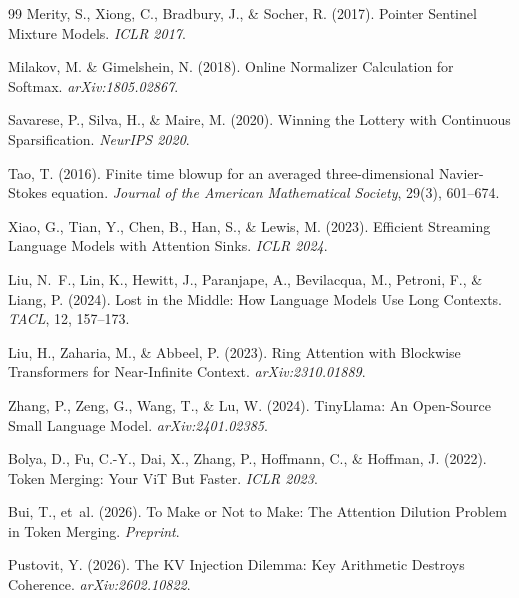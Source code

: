 \documentclass[11pt,a4paper]{article}
\begin{document}
\begin{thebibliography}{99}
Merity, S., Xiong, C., Bradbury, J., \& Socher, R. (2017).
\newblock Pointer Sentinel Mixture Models.
\newblock \emph{ICLR 2017}.

Milakov, M. \& Gimelshein, N. (2018).
\newblock Online Normalizer Calculation for Softmax.
\newblock \emph{arXiv:1805.02867}.

Savarese, P., Silva, H., \& Maire, M. (2020).
\newblock Winning the Lottery with Continuous Sparsification.
\newblock \emph{NeurIPS 2020}.

Tao, T. (2016).
\newblock Finite time blowup for an averaged three-dimensional Navier-Stokes equation.
\newblock \emph{Journal of the American Mathematical Society}, 29(3), 601--674.

Xiao, G., Tian, Y., Chen, B., Han, S., \& Lewis, M. (2023).
\newblock Efficient Streaming Language Models with Attention Sinks.
\newblock \emph{ICLR 2024}.

Liu, N.~F., Lin, K., Hewitt, J., Paranjape, A., Bevilacqua, M., Petroni, F., \& Liang, P. (2024).
\newblock Lost in the Middle: How Language Models Use Long Contexts.
\newblock \emph{TACL}, 12, 157--173.

Liu, H., Zaharia, M., \& Abbeel, P. (2023).
\newblock Ring Attention with Blockwise Transformers for Near-Infinite Context.
\newblock \emph{arXiv:2310.01889}.

Zhang, P., Zeng, G., Wang, T., \& Lu, W. (2024).
\newblock TinyLlama: An Open-Source Small Language Model.
\newblock \emph{arXiv:2401.02385}.

Bolya, D., Fu, C.-Y., Dai, X., Zhang, P., Hoffmann, C., \& Hoffman, J. (2022).
\newblock Token Merging: Your ViT But Faster.
\newblock \emph{ICLR 2023}.

Bui, T., et~al. (2026).
\newblock To Make or Not to Make: The Attention Dilution Problem in Token Merging.
\newblock \emph{Preprint}.

Pustovit, Y. (2026).
\newblock The KV Injection Dilemma: Key Arithmetic Destroys Coherence.
\newblock \emph{arXiv:2602.10822}.


\end{thebibliography}
\end{document}
